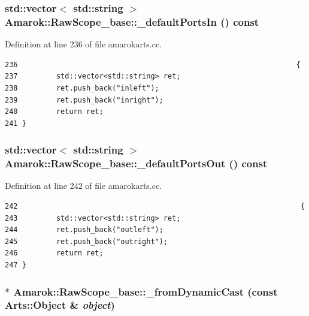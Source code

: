 \subsubsection{\setlength{\rightskip}{0pt plus 5cm}std::vector$<$ std::string $>$ Amarok::Raw\-Scope\_\-base::\_\-default\-Ports\-In () const\hspace{0.3cm}{\tt  [virtual, inherited]}}\label{classAmarok_1_1RawScope__base_Amarok_1_1RawScope__stuba5}




Definition at line 236 of file amarokarts.cc.



\footnotesize\begin{verbatim}236                                                                 {
237         std::vector<std::string> ret;
238         ret.push_back("inleft");
239         ret.push_back("inright");
240         return ret;
241 }
\end{verbatim}\normalsize 
{}
\subsubsection{\setlength{\rightskip}{0pt plus 5cm}std::vector$<$ std::string $>$ Amarok::Raw\-Scope\_\-base::\_\-default\-Ports\-Out () const\hspace{0.3cm}{\tt  [virtual, inherited]}}\label{classAmarok_1_1RawScope__base_Amarok_1_1RawScope__stuba6}




Definition at line 242 of file amarokarts.cc.



\footnotesize\begin{verbatim}242                                                                  {
243         std::vector<std::string> ret;
244         ret.push_back("outleft");
245         ret.push_back("outright");
246         return ret;
247 }
\end{verbatim}\normalsize 
{}
\subsubsection{ $\ast$ Amarok::Raw\-Scope\_\-base::\_\-from\-Dynamic\-Cast (const Arts::Object \& {\em object})\hspace{0.3cm}{\tt  [static, inherited]}}\label{classAmarok_1_1RawScope__base_Amarok_1_1RawScope__stube3}




